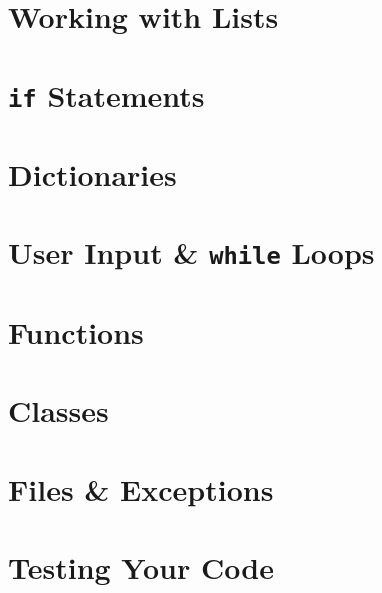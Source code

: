 \documentclass[oneside]{book}
\numberwithin{equation}{section}
\begin{document}

\section{Working with Lists}


\section{\texttt{if} Statements}


\section{Dictionaries}


\section{User Input \& \texttt{while} Loops}


\section{Functions}


\section{Classes}


\section{Files \& Exceptions}


\section{Testing Your Code}
\end{document}
